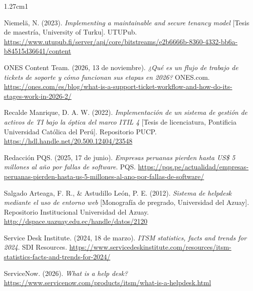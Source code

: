 \begin{hangparas}{1.27cm}{1}
\vspace{0.8em}

Niemelä, N. (2023). \textit{Implementing a maintainable and secure tenancy model} [Tesis de maestría, University of Turku]. UTUPub. \url{https://www.utupub.fi/server/api/core/bitstreams/e2b6666b-8360-4332-bb6a-b84515d36641/content}

\vspace{0.8em}

ONES Content Team. (2026, 13 de noviembre). \textit{¿Qué es un flujo de trabajo de tickets de soporte y cómo funcionan sus etapas en 2026?} ONES.com. \url{https://ones.com/es/blog/what-is-a-support-ticket-workflow-and-how-do-its-stages-work-in-2026-2/}

\vspace{0.8em}

Recalde Manrique, D. A. W. (2022). \textit{Implementación de un sistema de gestión de activos de TI bajo la óptica del marco ITIL 4} [Tesis de licenciatura, Pontificia Universidad Católica del Perú]. Repositorio PUCP. \url{https://hdl.handle.net/20.500.12404/23548}

\vspace{0.8em}

Redacción PQS. (2025, 17 de junio). \textit{Empresas peruanas pierden hasta US\$ 5 millones al año por fallas de software}. PQS. \url{https://pqs.pe/actualidad/empresas-peruanas-pierden-hasta-us-5-millones-al-ano-por-fallas-de-software/}

\vspace{0.8em}

Salgado Arteaga, F. R., \& Astudillo León, P. E. (2012). \textit{Sistema de helpdesk mediante el uso de entorno web} [Monografía de pregrado, Universidad del Azuay]. Repositorio Institucional Universidad del Azuay. \url{http://dspace.uazuay.edu.ec/handle/datos/2120}

\vspace{0.8em}

Service Desk Institute. (2024, 18 de marzo). \textit{ITSM statistics, facts and trends for 2024}. SDI Resources. \url{https://www.servicedeskinstitute.com/resources/itsm-statistics-facts-and-trends-for-2024/}

\vspace{0.8em}

ServiceNow. (2026). \textit{What is a help desk?} \url{https://www.servicenow.com/products/itsm/what-is-a-helpdesk.html}

\vspace{0.8em}


\end{hangparas}
